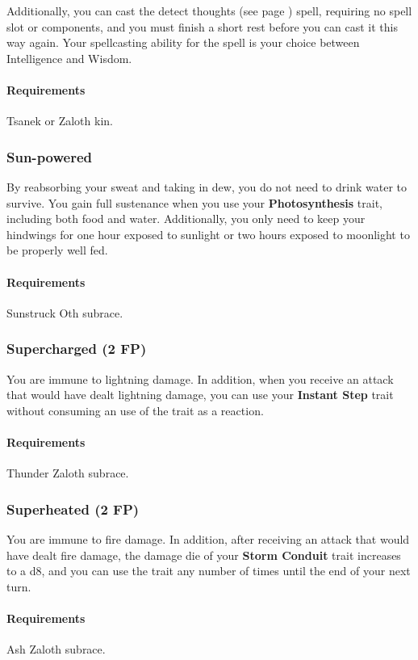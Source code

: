     Additionally, you can cast the detect thoughts (see page \pageref{spell::detectthoughts}) spell, requiring no spell slot or components, and you must finish a short rest before you can cast it this way again.
    Your spellcasting ability for the spell is your choice between Intelligence and Wisdom.
    \paragraph{Requirements} Tsanek or Zaloth kin.
\subsubsection{Sun-powered} \label{feat::sunpowered}
    By reabsorbing your sweat and taking in dew, you do not need to drink water to survive.
    You gain full sustenance when you use your \textbf{Photosynthesis} trait, including both food and water.
    Additionally, you only need to keep your hindwings for one hour exposed to sunlight or two hours exposed to moonlight to be properly well fed.
    \paragraph{Requirements} Sunstruck Oth subrace.
\subsubsection{Supercharged (2 FP)} \label{feat::supercharged}
    You are immune to lightning damage.
    In addition, when you receive an attack that would have dealt lightning damage, you can use your \textbf{Instant Step} trait without consuming an use of the trait as a reaction.
    \paragraph{Requirements} Thunder Zaloth subrace.
\subsubsection{Superheated (2 FP)} \label{feat::superheated}
    You are immune to fire damage.
    In addition, after receiving an attack that would have dealt fire damage, the damage die of your \textbf{Storm Conduit} trait increases to a d8, and you can use the trait any number of times until the end of your next turn.
    \paragraph{Requirements} Ash Zaloth subrace.
